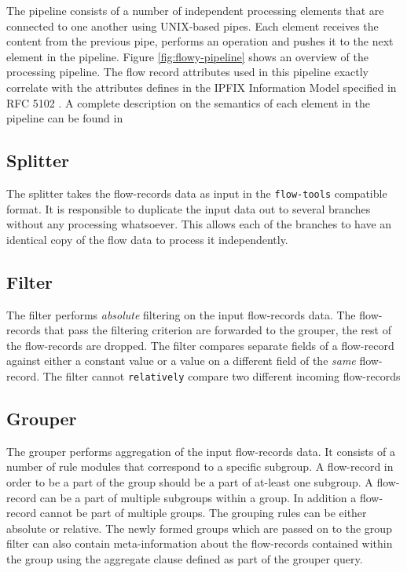 The pipeline consists of a number of independent processing elements that are connected to one another using UNIX-based pipes. Each element receives the content from the previous pipe, performs an operation and pushes it to the next element in the pipeline. Figure \ref{fig:flowy-pipeline} shows an overview of the processing pipeline. The flow record attributes used in this pipeline exactly correlate with the attributes defines in the \ac{IPFIX} Information Model specified in RFC 5102 \cite{rfc5102}. A complete description on the semantics of each element in the pipeline can be found in \cite{vmarinov:thesis:2009}

\subsection{Splitter}\label{subsec:splitter}
The splitter takes the flow-records data as input in the \texttt{flow-tools} compatible format. It is responsible to duplicate the input data out to several branches without any processing whatsoever. This allows each of the branches to have an identical copy of the flow data to process it independently.

\subsection{Filter}\label{subsec:filter}
The filter performs \emph{absolute} filtering on the input flow-records data. The flow-records that pass the filtering criterion are forwarded to the grouper, the rest of the flow-records are dropped. The filter compares separate fields of a flow-record against either a constant value or a value on a different field of the \emph{same} flow-record. The filter cannot \texttt{relatively} compare two different incoming flow-records

\subsection{Grouper}\label{subsec:grouper}
The grouper performs aggregation of the input flow-records data. It consists of a number of rule modules that correspond to a specific subgroup. A flow-record in order to be a part of the group should be a part of at-least one subgroup. A flow-record can be a part of multiple subgroups within a group. In addition a flow-record cannot be part of multiple groups. The grouping rules can be either absolute or relative. The newly formed groups which are passed on to the group filter can also contain meta-information about the flow-records contained within the group using the aggregate clause defined as part of the grouper query.

